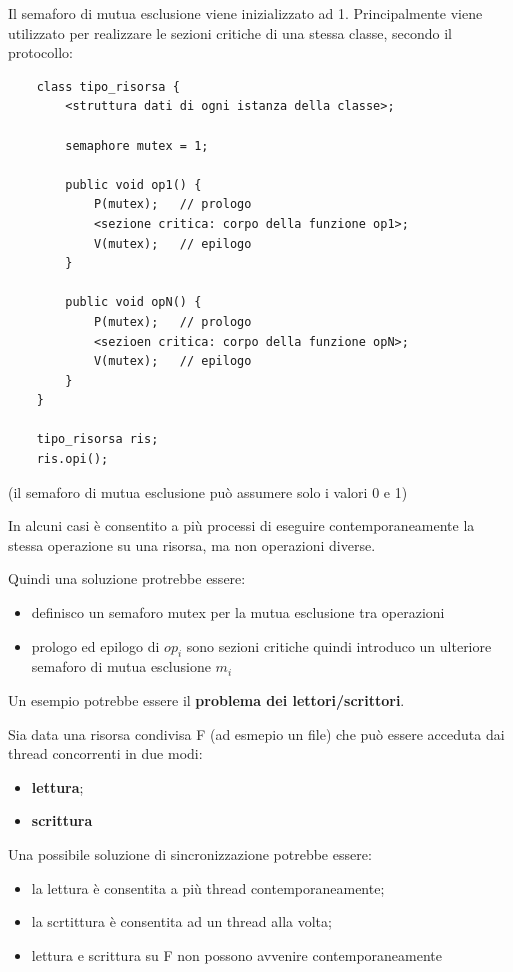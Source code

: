 \documentclass{article}
\begin{document}
\vspace{3mm}
Il semaforo di mutua esclusione viene inizializzato ad 1. Principalmente viene utilizzato per realizzare le sezioni critiche di una stessa classe, secondo il protocollo:

\begin{lstlisting}
    class tipo_risorsa {
        <struttura dati di ogni istanza della classe>;

        semaphore mutex = 1;

        public void op1() {
            P(mutex);   // prologo
            <sezione critica: corpo della funzione op1>;
            V(mutex);   // epilogo
        }

        public void opN() {
            P(mutex);   // prologo
            <sezioen critica: corpo della funzione opN>;
            V(mutex);   // epilogo
        }
    }

    tipo_risorsa ris;
    ris.opi();
\end{lstlisting}

(il semaforo di mutua esclusione può assumere solo i valori 0 e 1)

\vspace{3mm}
In alcuni casi è consentito a più processi di eseguire contemporaneamente la stessa operazione su una risorsa, ma non operazioni diverse.

Quindi una soluzione protrebbe essere:
\begin{itemize}
    \item definisco un semaforo mutex per la mutua esclusione tra operazioni
    \item prologo ed epilogo di $op_i$ sono sezioni critiche quindi introduco un ulteriore semaforo di mutua esclusione $m_i$
\end{itemize}

Un esempio potrebbe essere il \textbf{problema dei lettori/scrittori}.

Sia data una risorsa condivisa F (ad esmepio un file) che può essere acceduta dai thread concorrenti in due modi:
\begin{itemize}
    \item \textbf{lettura};
    \item \textbf{scrittura}
\end{itemize}

\vspace{3mm}
Una possibile soluzione di sincronizzazione potrebbe essere:
\begin{itemize}
    \item la lettura è consentita a più thread contemporaneamente;
    \item la scrtittura è consentita ad un thread alla volta;
    \item lettura e scrittura su F non possono avvenire contemporaneamente
\end{itemize}
\end{document}
